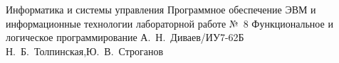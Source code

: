\documentclass[a4paper,oneside,14pt]{extarticle}
\begin{document}
\makereporttitle
    {Информатика и системы управления} %
    {Программное обеспечение ЭВМ и информационные технологии} %
    {лабораторной работе №~8} %
    {Функциональное и логическое программирование} %
    {} %
    {} %
    {А.~Н.~Диваев/ИУ7-62Б} %
    {Н.~Б.~Толпинская,Ю.~В.~Строганов} %

\setcounter{page}{2}





\end{document}
